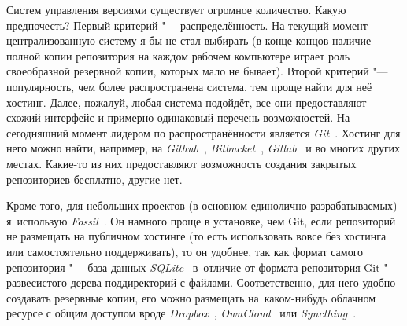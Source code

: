 \documentclass[a4paper,12pt,hyphens]{article}
\newcommand\softname[1]{\textit{#1}}
\begin{document}
Систем управления версиями существует огромное количество. Какую предпочесть?
Первый критерий "--- распределённость. На текущий момент централизованную систему
я бы не стал выбирать (в конце концов наличие полной копии репозитория на каждом
рабочем компьютере играет роль своеобразной резервной копии, которых мало не
бывает). Второй критерий "--- популярность, чем более распространена система, тем проще
найти для неё хостинг. Далее, пожалуй, любая система подойдёт, все они предоставляют
схожий интерфейс и примерно одинаковый перечень возможностей. На сегодняшний момент
лидером по распространённости является \softname{Git}~\parencite{site-git}.
Хостинг для него можно найти, например, на \softname{Github}~\parencite{site-github},
\softname{Bitbucket}~\parencite{site-bitbucket}, \softname{Gitlab}~\parencite{site-gitlab}
и во многих других местах. Какие-то из них предоставляют возможность создания закрытых
репозиториев бесплатно, другие нет.

Кроме того, для небольших проектов (в основном единолично разрабатываемых) я~использую
\softname{Fossil}~\parencite{site-fossil}. Он намного проще в установке, чем Git,
если репозиторий не размещать на публичном хостинге (то есть использовать вовсе без
хостинга или самостоятельно поддерживать), то он удобнее, так как формат самого
репозитория "--- база данных \softname{SQLite}~\parencite{site-sqlite} в~отличие от
формата репозитория Git "--- развесистого дерева поддиректорий с файлами. Соответственно,
для него удобно создавать резервные копии, его можно размещать на~каком-нибудь облачном
ресурсе с общим доступом вроде \softname{Dropbox}~\parencite{site-dropbox},
\softname{OwnCloud}~\parencite{site-owncloud} или \softname{Syncthing}~\parencite{site-syncthing}.
\end{document}
